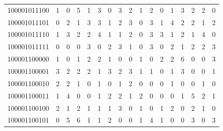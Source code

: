 \documentclass[10pt,a4paper]{article}
\begin{document}
\begin{longtable}{ |c|c|c|c|c|c|c|c|c|c|c|c|c|c|c|c|c| }
    100001011100              & 1                            & 0                                & 5                            & 1                              & 3   & 0   & 3   & 2   & 1   & 2   & 0   & 1   & 3   & 2   & 2   & 0   \\
    100001011101              & 0                            & 2                                & 1                            & 3                              & 3   & 1   & 2   & 3   & 0   & 3   & 1   & 4   & 2   & 2   & 1   & 2   \\
    100001011110              & 1                            & 3                                & 2                            & 2                              & 4   & 1   & 1   & 2   & 0   & 3   & 3   & 1   & 2   & 1   & 4   & 0   \\
    100001011111              & 0                            & 0                                & 0                            & 3                              & 0   & 2   & 3   & 1   & 0   & 3   & 0   & 2   & 1   & 2   & 2   & 3   \\
    100001100000              & 1                            & 0                                & 1                            & 2                              & 2   & 1   & 0   & 0   & 1   & 0   & 2   & 2   & 6   & 0   & 0   & 3   \\
    100001100001              & 3                            & 2                                & 2                            & 2                              & 1   & 3   & 2   & 3   & 1   & 1   & 0   & 1   & 3   & 0   & 0   & 1   \\
    100001100010              & 2                            & 2                                & 1                            & 0                              & 1   & 0   & 1   & 2   & 0   & 0   & 0   & 1   & 0   & 0   & 1   & 0   \\
    100001100011              & 1                            & 4                                & 0                            & 0                              & 1   & 2   & 2   & 1   & 2   & 0   & 0   & 0   & 1   & 5   & 2   & 1   \\
    100001100100              & 2                            & 1                                & 2                            & 1                              & 1   & 1   & 3   & 0   & 1   & 0   & 1   & 2   & 0   & 2   & 1   & 0   \\
    100001100101              & 0                            & 5                                & 6                            & 1                              & 1   & 2   & 0   & 0   & 1   & 4   & 1   & 0   & 0   & 3   & 0   & 3   \\

\end{longtable}
\end{document}
